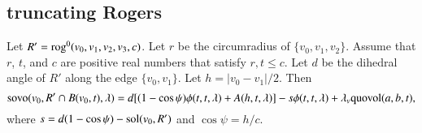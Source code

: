 %
%
%
%

\subsection{truncating Rogers}

\begin{lemma}
Let $R'={\operatorname{rog}}^0(v_0,v_1,v_2,v_3,c)$.  Let $r$ be the
circumradius of $\{v_0,v_1,v_2\}$.  Assume that $r$, $t$,
and $c$ are positive real numbers that satisfy $r, t\le c$.
Let $d$ be the dihedral angle of $R'$ along the edge $\{v_0,v_1\}$.
Let $h=|v_0-v_1|/2$.
Then
   $$
   {\operatorname{sovo}}(v_0,R'\cap B(v_0,t),\lambda) = 
   d [(1-\cos\psi)\phi(t,t,\lambda)+A(h,t,\lambda)]
   -s \phi(t,t,\lambda) + \lambda_v {\operatorname{quovol}}(a,b,t),
   $$
where $s = d (1-\cos\psi) - \operatorname{sol}(v_0,R')$ and $\cos\psi = h/c$.
\end{lemma}

